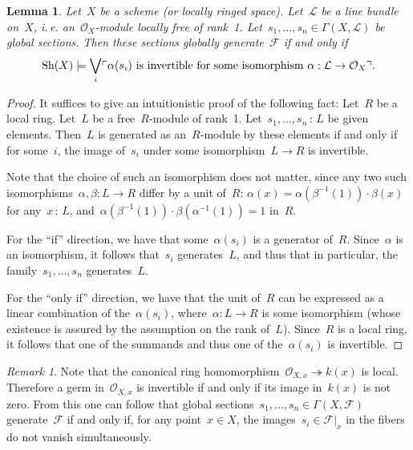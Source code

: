 \documentclass[10pt]{amsart}
\makeatletter
\theoremstyle{definition}
\theoremstyle{plain}
\newtheorem{lemma}[defn]{Lemma}
\theoremstyle{remark}
\newtheorem{rem}[defn]{Remark}
\newcommand{\F}{\mathcal{F}}
\renewcommand{\O}{\mathcal{O}}
\renewcommand{\L}{\mathcal{L}}
\newcommand{\Sh}{\mathrm{Sh}}
\newcommand{\?}{\,{:}\,}
\renewcommand{\_}{\mathpunct{.}\,}
\newcommand{\speak}[1]{\ulcorner\text{\textnormal{#1}}\urcorner}
\newcommand{\ie}{i.\,e.\@\xspace}
\makeatother
\begin{document}
\begin{lemma}Let~$X$ be a scheme (or locally ringed space). Let~$\L$ be a line
bundle on~$X$, \ie an~$\O_X$-module locally free of rank~1.
Let~$s_1,\ldots,s_n \in \Gamma(X,\L)$ be global sections. Then these sections
globally generate~$\F$ if and only if
\[ \Sh(X) \models \bigvee_i \speak{$\alpha(s_i)$ is invertible for some
isomorphism~$\alpha : \L \to \O_X$}. \]
\end{lemma}
\begin{proof}It suffices to give an intuitionistic proof of the following fact:
Let~$R$ be a local ring. Let~$L$ be a free~$R$-module of rank~1.
Let~$s_1,\ldots,s_n\?L$ be given elements. Then~$L$ is generated as
an~$R$-module by these elements if and only if for some~$i$, the image of~$s_i$
under some isomorphism~$L \to R$ is invertible.

Note that the choice of such an isomorphism does not matter, since any two such
isomorphisms~$\alpha, \beta : L \to R$ differ by a unit of~$R$: $\alpha(x) =
\alpha(\beta^{-1}(1)) \cdot \beta(x)$ for any~$x\?L$,
and~$\alpha(\beta^{-1}(1)) \cdot \beta(\alpha^{-1}(1)) = 1$ in~$R$.

For the ``if'' direction, we have that some~$\alpha(s_i)$ is a generator
of~$R$. Since~$\alpha$ is an isomorphism, it follows that~$s_i$ generates~$L$,
and thus that in particular, the family~$s_1,\ldots,s_n$ generates~$L$.

For the ``only if'' direction, we have that the unit of~$R$ can be expressed as
a linear combination of the~$\alpha(s_i)$, where~$\alpha : L \to R$ is some
isomorphism (whose existence is assured by the assumption on the rank of~$L$).
Since~$R$ is a local ring, it follows that one of the summands and thus one of
the~$\alpha(s_i)$ is invertible.
\end{proof}

\begin{rem}Note that the canonical ring homomorphism~$\O_{X,x}
\twoheadrightarrow k(x)$ is local. Therefore a germ in~$\O_{X,x}$ is invertible
if and only if its image in~$k(x)$ is not zero. From this one can follow that
global sections~$s_1,\ldots,s_n \in \Gamma(X,\F)$ generate~$\F$ if and only if,
for any point~$x \in X$, the images~$s_i \in \F|_x$ in the fibers do not vanish
simultaneously.
\end{rem}
\end{document}

